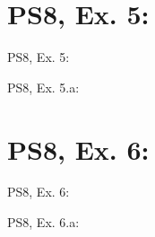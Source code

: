 \section{PS8, Ex. 5: }

\begin{frame}{PS8, Ex. 5: }
    \begin{multicols}{2}
      \vfill\null\columnbreak
      \vfill
    \end{multicols}
\end{frame}

\begin{frame}{PS8, Ex. 5.a: }
    \begin{multicols}{2}
      \vfill\null\columnbreak
      \vfill\null
    \end{multicols}
\end{frame}



\section{PS8, Ex. 6: }

\begin{frame}{PS8, Ex. 6: }
    \begin{multicols}{2}
      \vfill\null\columnbreak
      \vfill\null
    \end{multicols}
\end{frame}

\begin{frame}{PS8, Ex. 6.a: }
    \begin{multicols}{2}
      \vfill\null\columnbreak
      \vfill\null
    \end{multicols}
\end{frame}
